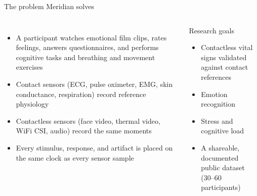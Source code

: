 \documentclass[aspectratio=169,11pt]{beamer}
\begin{document}
\begin{frame}{The problem Meridian solves}
  \begin{columns}[T]
    \begin{itemize}
      \item A participant watches emotional film clips, rates feelings, answers questionnaires, and performs cognitive tasks and breathing and movement exercises
      \item Contact sensors (ECG, pulse oximeter, EMG, skin conductance, respiration) record reference physiology
      \item Contactless sensors (face video, thermal video, WiFi CSI, audio) record the same moments
      \item Every stimulus, response, and artifact is placed on the \alert{same clock} as every sensor sample
    \end{itemize}
    \begin{block}{Research goals}
      \begin{itemize}
        \item Contactless vital signs validated against contact references
        \item Emotion recognition
        \item Stress and cognitive load
        \item A shareable, documented public dataset (30--60 participants)
      \end{itemize}
    \end{block}
  \end{columns}
\end{frame}
\end{document}

